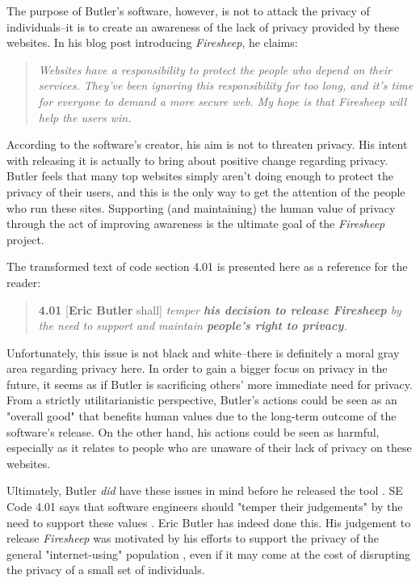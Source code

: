 \documentclass[11pt]{article}
\begin{document}
\begin{multicols}{2}
The purpose of Butler's software, however, is not to attack the privacy of individuals--it is to create an awareness of the lack of privacy provided by these websites. In his blog post introducing \emph{Firesheep}, he claims:

\begin{quote}
\emph{Websites have a responsibility to protect the people who depend on their services. They've been ignoring this responsibility for too long, and it's time for everyone to demand a more secure web. My hope is that Firesheep will help the users win.} \cite{codebutler_main}
\end{quote}

According to the software's creator, his aim is not to threaten privacy. His intent with releasing it is actually to bring about positive change regarding privacy. Butler feels that many top websites simply aren't doing enough to protect the privacy of their users, and this is the only way to get the attention of the people who run these sites. Supporting (and maintaining) the human value of privacy through the act of improving awareness is the ultimate goal of the \emph{Firesheep} project.

The transformed text of code section 4.01 is presented here as a reference for the reader:

\begin{quote}
\textbf{4.01} [\textbf{Eric Butler} shall] \emph{temper \textbf{his decision to release Firesheep} by the need to support and maintain \textbf{people's right to privacy}.} \cite{se_code}
\end{quote}

Unfortunately, this issue is not black and white--there is definitely a moral gray area regarding privacy here. In order to gain a bigger focus on privacy in the future, it seems as if Butler is sacrificing others' more immediate need for privacy. From a strictly utilitarianistic perspective, Butler's actions could be seen as an "overall good" that benefits human values due to the long-term outcome of the software's release. On the other hand, his actions could be seen as harmful, especially as it relates to people who are unaware of their lack of privacy on these websites.

Ultimately, Butler \emph{did} have these issues in mind before he released the tool \cite{codebutler_main}. SE Code 4.01 says that software engineers should "temper their judgements" by the need to support these values \cite{se_code}. Eric Butler has indeed done this. His judgement to release \emph{Firesheep} was motivated by his efforts to support the privacy of the general "internet-using" population \cite{codebutler_main}, even if it may come at the cost of disrupting the privacy of a small set of individuals.


\end{multicols}
\end{document}

